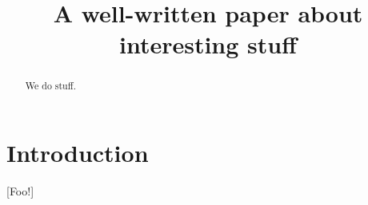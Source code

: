 \documentclass[a4paper,10pt]{llncs}
\title{A well-written paper about interesting stuff}
\def\buildexternal{1}
\newcommand{\tikzexternalizemaybe}{%
  \ifthenelse{\equal{\buildexternal}{1}}%
  {\tikzset{external/export=true}}%
  {\tikzset{external/export=false}%
}}%
\begin{document}
\maketitle

\begin{abstract}
  We do stuff.
\end{abstract}

\section{Introduction}\label{sec:introduction}

[Foo!]





\clearpage


\end{document}
